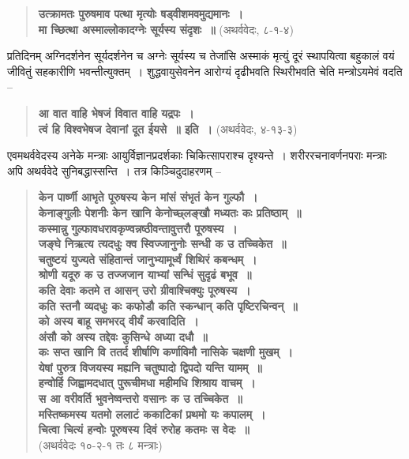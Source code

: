{\begin{verse}
\textbf{उत्क्रामतः पुरुषमाव पत्था मृत्योः षड्वीशमवमुद्यमानः~। }\\
\textbf{मा च्छित्था अस्माल्लोकादग्नेः सूर्यस्य संदृशः~॥} (अथर्ववेदः, ८-१-४)
\end{verse}

प्रतिदिनम् अग्निदर्शनेन सूर्यदर्शनेन च अग्नेः सूर्यस्य च तेजांसि अस्माकं मृत्युं दूरं स्थापयित्वा बहुकालं वयं जीवितुं सहकारीणि भवन्तीत्युक्तम्~। शुद्धवायुसेवनेन आरोग्यं दृढीभवति स्थिरीभवति चेति मन्त्रोऽयमेवं वदति –

\begin{verse}
\textbf{आ वात वाहि भेषजं विवात वाहि यद्रपः~। }\\
\textbf{त्वं हि विश्वभेषज देवानां दूत ईयसे~॥ इति~। } (अथर्ववेदः, ४-१३-३)
\end{verse}

एवमथर्ववेदस्य अनेके मन्त्राः आयुर्विज्ञानप्रदर्शकाः चिकित्सापराश्च दृश्यन्ते~। शरीररचनावर्णनपराः मन्त्राः अपि अथर्ववेदे सुनिबद्धास्सन्ति~। तत्र किञ्चिदुदाहरणम् –

\begin{verse}
\textbf{केन पार्ष्णी आभृते पूरुषस्य केन मांसं संभृतं केन गुल्फौ~। }\\
\textbf{केनाङ्गुलीः पेशनीः केन खानि केनोच्छ्लङ्खौ मध्यतः कः प्रतिष्ठाम्~॥}\\
\textbf{कस्मान्नु गुल्फावधरावकृण्वन्नष्ठीवन्तावुत्तरौ पूरुषस्य~। }\\
\textbf{जङ्घे निऋत्य त्यदधुः क्व स्विज्जानुनोः सन्धी क उ तच्चिकेत~॥}\\
\textbf{चतुष्टयं युज्यते संहितान्तं जानुभ्यामूर्ध्वं शिथिरं कबन्धम्~। }\\
\textbf{श्रोणी यदूरु क उ तज्जजान याभ्यां सन्धिं सुदृढं बभूव~॥}\\
\textbf{कति देवाः कतमे त आसन् उरो ग्रीवाश्चिक्युः पूरुषस्य~। }\\
\textbf{कति स्तनौ व्यदधुः कः कफोडौ कति स्कन्धान् कति पृष्टिरचिन्वन्~॥}\\
\textbf{को अस्य बाहू समभरद् वीर्यं करवादिति~। }\\
\textbf{अंसौ को अस्य तद्देवः कुसिन्धे अध्या दधौ~॥}\\
\textbf{कः सप्त खानि वि ततर्द शीर्षाणि कर्णाविमौ नासिके चक्षणी मुखम्~। }\\
\textbf{येषां पुरुत्र विजयस्य मह्यनि चतुष्पादो द्विपदो यन्ति यामम्~॥}\\
\textbf{हन्वोर्हि जिह्वामदधात् पुरूचीमधा महीमधि शिश्राय वाचम्~। }\\
\textbf{स आ वरीवर्ति भुवनेष्वन्तरो वसानः क उ तच्चिकेत~॥}\\
\textbf{मस्तिष्कमस्य यतमो ललाटं ककाटिकां प्रथमो यः कपालम्~। }\\
\textbf{चित्वा चित्यं हन्वोः पूरुषस्य दिवं रुरोह कतमः स वेदः~॥}\\
\hspace{4cm}(अथर्ववेदः १०-२-१ तः ८ मन्त्राः)
\end{verse}

}
